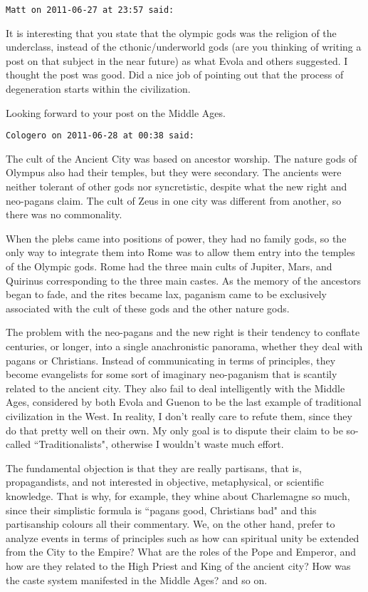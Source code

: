 \begin{footnotesize}
\begin{sffamily}
\hfill

\texttt{Matt on 2011-06-27 at 23:57 said: }

It is interesting that you state that the olympic gods was the religion of the underclass, instead of the cthonic/underworld gods (are you thinking of writing a post on that subject in the near future) as what Evola and others suggested. I thought the post was good. Did a nice job of pointing out that the process of degeneration starts within the civilization.

Looking forward to your post on the Middle Ages.


\hfill

\texttt{Cologero on 2011-06-28 at 00:38 said: }

The cult of the Ancient City was based on ancestor worship. The nature gods of Olympus also had their temples, but they were secondary. The ancients were neither tolerant of other gods nor syncretistic, despite what the new right and neo-pagans claim. The cult of Zeus in one city was different from another, so there was no commonality.

When the plebs came into positions of power, they had no family gods, so the only way to integrate them into Rome was to allow them entry into the temples of the Olympic gods. Rome had the three main cults of Jupiter, Mars, and Quirinus corresponding to the three main castes. As the memory of the ancestors began to fade, and the rites became lax, paganism came to be exclusively associated with the cult of these gods and the other nature gods.

The problem with the neo-pagans and the new right is their tendency to conflate centuries, or longer, into a single anachronistic panorama, whether they deal with pagans or Christians. Instead of communicating in terms of principles, they become evangelists for some sort of imaginary neo-paganism that is scantily related to the ancient city. They also fail to deal intelligently with the Middle Ages, considered by both Evola and Guenon to be the last example of traditional civilization in the West. In reality, I don't really care to refute them, since they do that pretty well on their own. My only goal is to dispute their claim to be so-called ``Traditionalists", otherwise I wouldn't waste much effort.

The fundamental objection is that they are really partisans, that is, propagandists, and not interested in objective, metaphysical, or scientific knowledge. That is why, for example, they whine about Charlemagne so much, since their simplistic formula is ``pagans good, Christians bad" and this partisanship colours all their commentary. We, on the other hand, prefer to analyze events in terms of principles such as how can spiritual unity be extended from the City to the Empire? What are the roles of the Pope and Emperor, and how are they related to the High Priest and King of the ancient city? How was the caste system manifested in the Middle Ages? and so on.



\end{sffamily}
\end{footnotesize}
